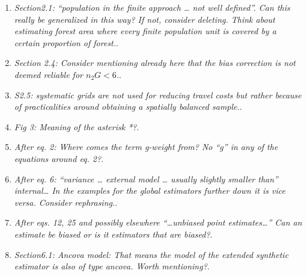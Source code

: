 \documentclass{article}
\begin{document}
\begin{enumerate}

\item \textit{Section2.1: “population in the finite approach … not well defined”. Can this really be generalized in this way? If not, consider deleting. Think about estimating forest area where every finite population unit is covered by a certain proportion of forest.}.

\answerfin{}

\item \textit{Section 2.4: Consider mentioning already here that the bias correction is not deemed reliable for $n_2G < 6$.}.

\answerfin{}

\item \textit{S2.5: systematic grids are not used for reducing travel costs but rather because of practicalities around obtaining a spatially balanced sample.}.

\answerfin{}

\item \textit{Fig 3: Meaning of the asterisk *?}.


\item \textit{After eq. 2: Where comes the term g-weight from? No “g” in any of the equations around eq. 2?}.

\answerfin{}

\item \textit{After eq. 6: “variance … external model … usually slightly smaller than” internal… In the examples for the global estimators further down it is vice versa. Consider rephrasing.}.

\answerfin{}

\item \textit{After eqs. 12, 25 and possibly elsewhere “…unbiased point estimates…” Can an estimate be biased or is it estimators that are biased?}.

\answerfin{}

\item \textit{Section6.1: Ancova model: That means the model of the extended synthetic estimator is also of type ancova. Worth mentioning?}.


\end{enumerate}
\end{document}
